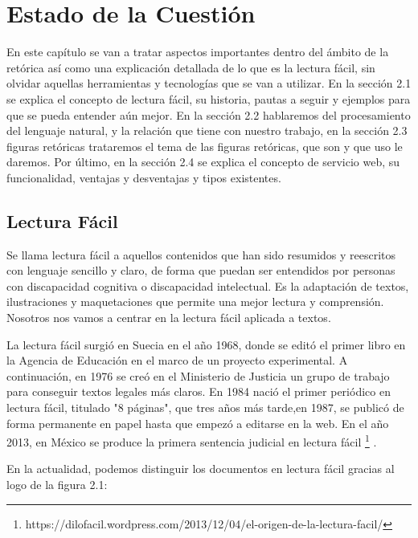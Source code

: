 \chapter{Estado de la Cuestión}
\label{cap:estadoDeLaCuestion}


	En este capítulo se van a tratar aspectos importantes dentro del ámbito de la retórica así como una explicación detallada de lo que es la lectura fácil, sin olvidar aquellas herramientas y tecnologías que se van a utilizar.
	En la sección 2.1 se explica el concepto de lectura fácil, su historia, pautas a seguir y ejemplos para que se pueda entender aún mejor. 
	En la sección 2.2 hablaremos del procesamiento del lenguaje natural, y la relación que tiene con nuestro trabajo, en la sección 2.3 figuras retóricas trataremos el tema de las figuras retóricas, que son y que uso le daremos. Por último, en la sección 2.4 se explica el concepto de servicio web, su funcionalidad, ventajas y desventajas y tipos existentes.
	




\section{Lectura Fácil}

Se llama lectura fácil a aquellos contenidos que han sido resumidos y reescritos con lenguaje sencillo y claro, de forma que puedan ser entendidos por personas con discapacidad cognitiva o discapacidad intelectual. Es la adaptación de textos, ilustraciones y maquetaciones que permite una mejor lectura y comprensión.
Nosotros nos vamos a centrar en la lectura fácil aplicada a textos.

La lectura fácil surgió en Suecia en el año 1968, donde se editó el primer libro en la Agencia de Educación en el marco de un proyecto experimental. A continuación, en 1976 se creó en el Ministerio de Justicia un grupo de trabajo para conseguir textos legales más claros.
En 1984 nació el primer periódico en lectura fácil, titulado "8 páginas", que tres años más tarde,en 1987, se publicó de forma permanente en papel hasta que empezó a editarse en la web. 
En el año 2013, en México se produce la primera sentencia judicial en lectura fácil \footnote{https://dilofacil.wordpress.com/2013/12/04/el-origen-de-la-lectura-facil/}
.

En la actualidad, podemos distinguir los documentos en lectura fácil gracias al logo de la figura 2.1:
	
